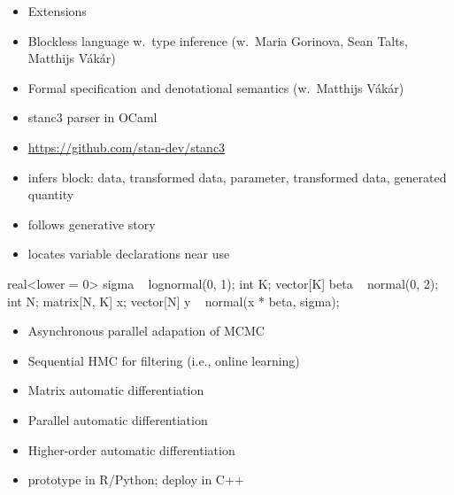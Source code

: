 \documentclass[10pt]{report}
\begin{document}

\begin{itemize}
\item Extensions
\item Blockless language w.\ type inference (w.\ Maria Gorinova, Sean Talts, Matthijs V\'ak\'ar)
\item Formal specification and denotational semantics (w.\ Matthijs V\'ak\'ar)
\item stanc3 parser in OCaml
\item {\footnotesize \url{https://github.com/stan-dev/stanc3}}
\end{itemize}

\begin{itemize}
\item infers block: data, transformed data, parameter, transformed data, generated quantity
\item follows generative story
\item locates variable declarations near use
\end{itemize}
\begin{stancode}
real<lower = 0> sigma ~ lognormal(0, 1);
int K;
vector[K] beta ~ normal(0, 2);
int N;
matrix[N, K] x;
vector[N] y ~ normal(x * beta, sigma);
\end{stancode}

\begin{itemize}
\item Asynchronous parallel adapation of MCMC
\item Sequential HMC for filtering (i.e., online learning)
\item Matrix automatic differentiation
\item Parallel automatic differentiation
\item Higher-order automatic differentiation
\item prototype in R/Python; deploy in C++
\end{itemize}
\end{document}
